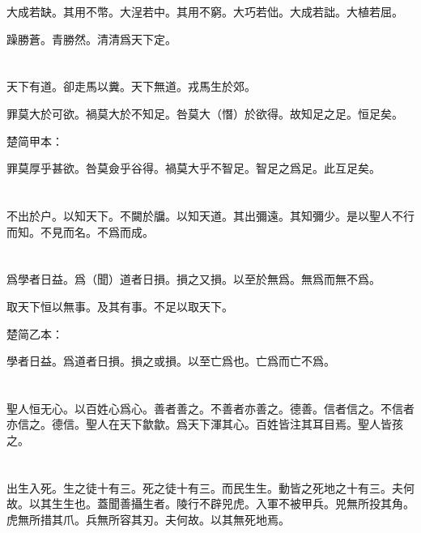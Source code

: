 \documentclass[a5paper]{ctexbook}
\begin{document}
    大成若缺。其用不幣。大浧若中。其用不窮。大巧若㑁。大成若詘。大植若屈。

    躁勝蒼。青勝然。清清爲天下定。

    \chapter{}

    天下有道。卻走馬以糞。天下無道。戎馬生於郊。
    
    罪莫大於可欲。禍莫大於不知足。咎莫大（憯）於欲得。故知足之足。恒足矣。

    楚简甲本：

    罪莫厚乎甚欲。咎莫僉乎谷得。禍莫大乎不智足。智足之爲足。此互足矣。

    \chapter{}

    不出於户。以知天下。不闚於牖。以知天道。其出彌遠。其知彌少。是以聖人不行而知。不見而名。不爲而成。

    \chapter{}

    爲學者日益。爲（聞）道者日損。損之又損。以至於無爲。無爲而無不爲。
    
    取天下恒以無事。及其有事。不足以取天下。

    楚简乙本：

    學者日益。爲道者日損。損之或損。以至亡爲也。亡爲而亡不爲。

    \chapter{}

    聖人恒无心。以百姓心爲心。善者善之。不善者亦善之。德善。信者信之。不信者亦信之。德信。聖人在天下歙歙。爲天下渾其心。百姓皆注其耳目焉。聖人皆孩之。

    \chapter{}

    出生入死。生之徒十有三。死之徒十有三。而民生生。動皆之死地之十有三。夫何故。以其生生也。蓋聞善攝生者。陵行不辟兕虎。入軍不被甲兵。兕無所投其角。虎無所措其爪。兵無所容其刃。夫何故。以其無死地焉。

    \chapter{}
\end{document}
